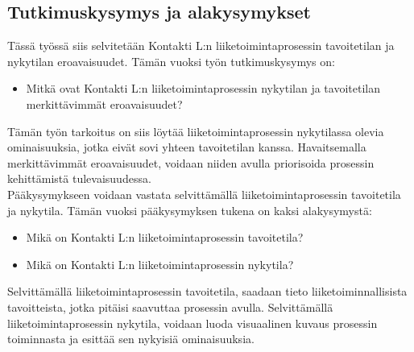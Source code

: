 \documentclass[finnish,12pt,a4paper,pdftex]{article}
\begin{document}

\subsection{Tutkimuskysymys ja alakysymykset}

Tässä työssä siis selvitetään Kontakti L:n liiketoimintaprosessin tavoitetilan ja nykytilan eroavaisuudet. Tämän vuoksi työn tutkimuskysymys on:
\begin{itemize}
\item Mitkä ovat Kontakti L:n liiketoimintaprosessin nykytilan ja tavoitetilan merkittävimmät eroavaisuudet?
\end{itemize}

\noindent Tämän työn tarkoitus on siis löytää liiketoimintaprosessin nykytilassa olevia ominaisuuksia, jotka eivät sovi yhteen tavoitetilan kanssa. Havaitsemalla merkittävimmät eroavaisuudet, voidaan niiden avulla priorisoida prosessin kehittämistä tulevaisuudessa.\\

\noindent Pääkysymykseen voidaan vastata selvittämällä liiketoimintaprosessin tavoitetila ja nykytila. Tämän vuoksi pääkysymyksen tukena on kaksi alakysymystä:
\begin{itemize}
     \item Mikä on Kontakti L:n liiketoimintaprosessin tavoitetila?
     \item Mikä on Kontakti L:n liiketoimintaprosessin nykytila?
   \end{itemize}

\noindent Selvittämällä liiketoimintaprosessin tavoitetila, saadaan tieto liiketoiminnallisista tavoitteista, jotka pitäisi saavuttaa prosessin avulla. Selvittämällä liiketoimintaprosessin nykytila, voidaan luoda visuaalinen kuvaus prosessin toiminnasta ja esittää sen nykyisiä ominaisuuksia.


\end{document}
